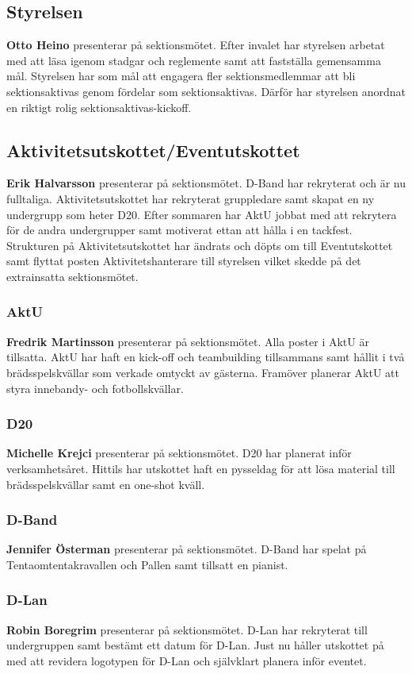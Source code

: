 \documentclass[../protokoll_hostmote_2021.tex]{subfiles}
\begin{document}
\subsection{Styrelsen}
\textbf{Otto Heino} presenterar på sektionsmötet.
Efter invalet har styrelsen arbetat med att läsa igenom stadgar och reglemente samt att fastställa gemensamma mål. Styrelsen har som mål att engagera fler sektionsmedlemmar att bli sektionsaktivas genom fördelar som sektionsaktivas. Därför har styrelsen anordnat en riktigt rolig sektionsaktivas-kickoff. 
\subsection{Aktivitetsutskottet/Eventutskottet}
\textbf{Erik Halvarsson} presenterar på sektionsmötet.
D-Band har rekryterat och är nu fulltaliga. Aktivitetsutskottet har rekryterat gruppledare samt skapat en ny undergrupp som heter D20. Efter sommaren har AktU jobbat med att rekrytera för de andra undergrupper samt motiverat ettan att hålla i en tackfest. Strukturen på Aktivitetsutskottet har ändrats och döpts om till Eventutskottet samt flyttat posten Aktivitetshanterare till styrelsen vilket skedde på det extrainsatta sektionsmötet.
\subsubsection{AktU}
\textbf{Fredrik Martinsson} presenterar på sektionsmötet.
Alla poster i AktU är tillsatta. AktU har haft en kick-off och teambuilding tillsammans samt hållit i två brädsspelskvällar som verkade omtyckt av gästerna. Framöver planerar AktU att styra innebandy- och fotbollskvällar.
\subsubsection{D20}
\textbf{Michelle Krejci} presenterar på sektionsmötet.
D20 har planerat inför verksamhetsåret. Hittils har utskottet haft en pysseldag för att lösa material till brädsspelskvällar samt en one-shot kväll.
\subsubsection{D-Band}
\textbf{Jennifer Österman} presenterar på sektionsmötet.
D-Band har spelat på Tentaomtentakravallen och Pallen samt tillsatt en pianist. 
\subsubsection{D-Lan}
\textbf{Robin Boregrim} presenterar på sektionsmötet.
D-Lan har rekryterat till undergruppen samt bestämt ett datum för D-Lan. Just nu håller utskottet på med att revidera logotypen för D-Lan och självklart planera inför eventet.
\end{document}
